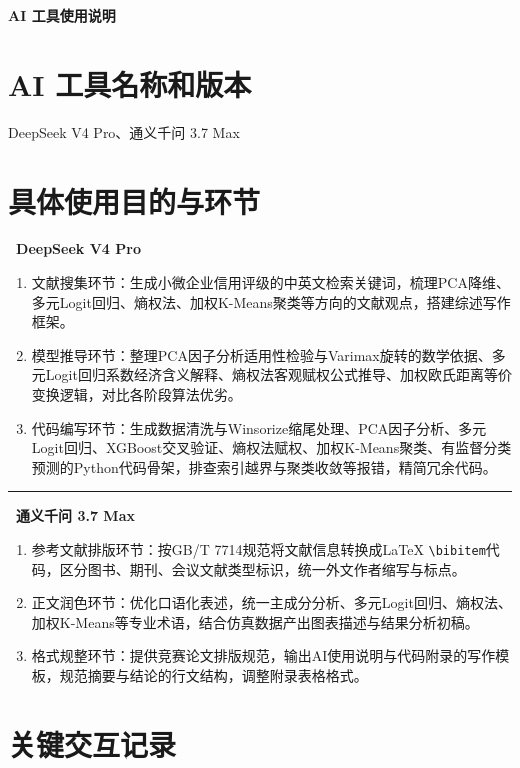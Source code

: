 \documentclass[12pt,a4paper]{ctexart}
\begin{document}
\begin{center}
{\heiti\bfseries AI 工具使用说明}
\end{center}

\section{AI 工具名称和版本}

DeepSeek V4 Pro、通义千问 3.7 Max

\section{具体使用目的与环节}

\noindent\textbf{\textbullet~DeepSeek V4 Pro}

\begin{enumerate}[label=(\arabic*)]
  \item 文献搜集环节：生成小微企业信用评级的中英文检索关键词，梳理PCA降维、多元Logit回归、熵权法、加权K-Means聚类等方向的文献观点，搭建综述写作框架。
  \item 模型推导环节：整理PCA因子分析适用性检验与Varimax旋转的数学依据、多元Logit回归系数经济含义解释、熵权法客观赋权公式推导、加权欧氏距离等价变换逻辑，对比各阶段算法优劣。
  \item 代码编写环节：生成数据清洗与Winsorize缩尾处理、PCA因子分析、多元Logit回归、XGBoost交叉验证、熵权法赋权、加权K-Means聚类、有监督分类预测的Python代码骨架，排查索引越界与聚类收敛等报错，精简冗余代码。
\end{enumerate}

\noindent\rule{\linewidth}{0.4pt}

\noindent\textbf{\textbullet~通义千问 3.7 Max}

\begin{enumerate}[label=(\arabic*)]
  \item 参考文献排版环节：按GB/T 7714规范将文献信息转换成LaTeX \verb|\bibitem|代码，区分图书、期刊、会议文献类型标识，统一外文作者缩写与标点。
  \item 正文润色环节：优化口语化表述，统一主成分分析、多元Logit回归、熵权法、加权K-Means等专业术语，结合仿真数据产出图表描述与结果分析初稿。
  \item 格式规整环节：提供竞赛论文排版规范，输出AI使用说明与代码附录的写作模板，规范摘要与结论的行文结构，调整附录表格格式。
\end{enumerate}

\section{关键交互记录}
\end{document}
